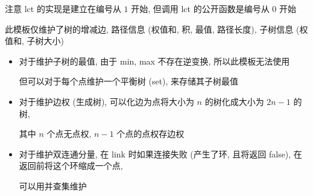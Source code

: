 注意 lct 的实现是建立在编号从 \(1\) 开始, 但调用 lct 的公开函数是编号从 \(0\) 开始

此模板仅维护了树的增减边, 路径信息 (权值和, 积, 最值, 路径长度), 子树信息 (权值和, 子树大小)

\begin{itemize}
    \item 对于维护子树的最值, 由于 min, max 不存在逆变换, 所以此模板无法使用

          但可以对于每个点维护一个平衡树 (set), 来存储其子树最值

    \item 对于维护边权 (生成树), 可以化边为点将大小为 \(n\) 的树化成大小为 \(2n - 1\) 的树,

          其中 \(n\) 个点无点权, \(n-1\) 个点的点权存边权

    \item 对于维护双连通分量, 在 link 时如果连接失败 (产生了环, 且将返回 false), 在返回前将这个环缩成一个点,

          可以用并查集维护
\end{itemize}